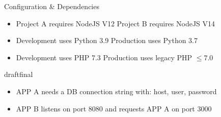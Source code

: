 \documentclass{beamer}
\def\final{final}
\def\status{draft}
\begin{document}
\begin{frame}{}
  \vspace{-.6cm}
  \begin{center}
    \Large Configuration \& Dependencies
  \end{center}

  \begin{block}{}
    \begin{itemize}
      \small
      \setlength\itemsep{0em}
      \item Project A requires NodeJS V12 {\color{uos-red-full}\text{\marvosymLightning}} Project B requires NodeJS V14
      \item Development uses Python 3.9 {\color{uos-red-full}\text{\marvosymLightning}} Production uses Python 3.7
      \item Development uses PHP 7.3 {\color{uos-red-full}\text{\marvosymLightning}} Production uses legacy PHP \(\leq 7.0\)
    \end{itemize}
  \end{block}

  \ifx\status\final{}
    \pause{}
  \fi

  \begin{block}{}
    \begin{itemize}
      \small
      \setlength\itemsep{0em}
      \item APP A needs a DB connection string with: host, user, password
      \item APP B listens on port 8080 and requests APP A on port 3000
    \end{itemize}
  \end{block}
\end{frame}
\end{document}
